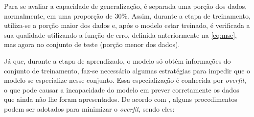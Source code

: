 \documentclass[
    12pt,
    oneside,
    a4paper,
    english,
    brazil
]{abntex2}
\begin{document}
Para se avaliar a capacidade de generalização, é separada uma porção dos dados,
normalmente, em uma  proporção de 30\%. Assim, durante a  etapa de treinamento,
utiliza-se  a  porção maior  dos  dados  e, após  o  modelo  estar treinado,  é
verificada a sua qualidade  utilizando a função de erro,  definida anteriormente
na \autoref{eq:mse}, mas agora no conjunto de teste (porção menor dos dados).

Já  que, durante  a etapa  de  aprendizado, o  modelo só  obtém informações  do
conjunto de treinamento, faz-se necessário algumas estratégias para impedir que
o modelo  se especialize  nesse conjunto. Essa  especialização é  conhecida por
\textit{overfit},  o  que  pode  causar  a incapacidade  do  modelo  em  prever
corretamente  os  dados  que  ainda  não  lhe  foram  apresentados.  De  acordo
com  , alguns  procedimentos podem  ser adotados  para
minimizar o \textit{overfit}, sendo eles:
\end{document}
